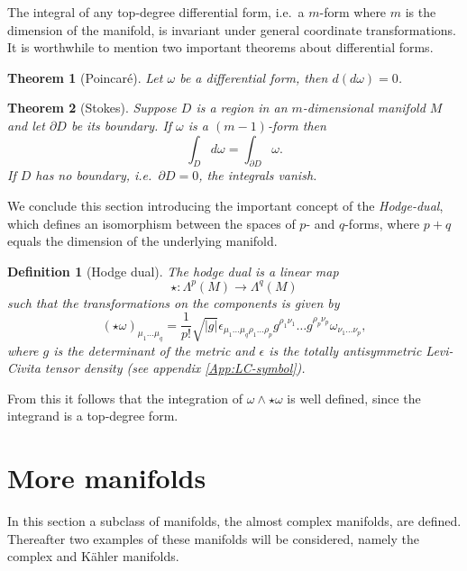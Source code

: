 \documentclass[12pt,twoside]{book}
\newtheorem{definition}{Definition}[chapter]
\newtheorem{theorem}{Theorem}[chapter]
\begin{document}
The integral of any top-degree differential form, i.e.\ a $m$-form where $m$ is the dimension of the manifold, is invariant under general coordinate transformations. It is worthwhile to mention two important theorems about differential forms.
\begin{theorem}[Poincar\'e]
Let $\omega$ be a differential form, then $d(d\omega) = 0$.
\end{theorem}
\begin{theorem}[Stokes]\label{stokes}
Suppose $D$ is a region in an $m$-dimensional manifold $M$ and let $\partial D$ be its boundary. If $\omega$ is a $(m-1)$-form then
\begin{equation}
\int_{D}d\omega = \int_{\partial D}\omega.
\end{equation}
If $D$ has no boundary, i.e.\ $\partial D = 0$, the integrals vanish.
\end{theorem}

We conclude this section introducing the important concept of the \emph{Hodge-dual}, which defines an isomorphism between the spaces of $p$- and $q$-forms, where $p+q$ equals the dimension of the underlying manifold.
\begin{definition}[Hodge dual]
The hodge dual is a linear map
\begin{equation}
\star : \Lambda^{p}(M)\rightarrow\Lambda^{q}(M)
\end{equation}such that the transformations on the components is given by
\begin{equation}\label{def:covCompHodge}
(\star\omega)_{\mu_{1}\ldots\mu_{q}}=\frac{1}{p!}\sqrt{|g|}\epsilon_{\mu_{1}\ldots\mu_{q}\rho_{1}\ldots\rho_{p}}g^{\rho_{1}\nu_{1}}\ldots g^{\rho_{p}\nu_{p}}\omega_{\nu_{1}\dots\nu_{p}},
\end{equation}where $g$ is the determinant of the metric and $\epsilon$ is the totally antisymmetric Levi-Civita tensor density (see appendix \ref{App:LC-symbol}).
\end{definition}\noindent From this it follows that the integration of $\omega\wedge\star\omega$ is well defined, since the integrand is a top-degree form.

\section{More manifolds}

In this section a subclass of manifolds, the almost complex manifolds, are defined. Thereafter two examples of these manifolds will be considered, namely the complex and K\"ahler manifolds.
\end{document}
